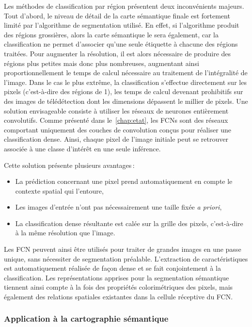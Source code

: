 Les méthodes de classification par région présentent deux inconvénients majeurs. Tout d'abord, le niveau de détail de la carte sémantique finale est fortement limité par l'algorithme de segmentation utilisé. En effet, si l'algorithme produit des régions grossières, alors la carte sémantique le sera également, car la classification ne permet d'associer qu'une seule étiquette à chacune des régions traitées. Pour augmenter la résolution, il est alors nécessaire de produire des régions plus petites mais donc plus nombreuses, augmentant ainsi proportionnellement le temps de calcul nécessaire au traitement de l'intégralité de l'image. Dans le cas le plus extrême, la classification s'effectue directement sur les pixels (c'est-à-dire des régions de \SI{1}{\px}), les temps de calcul devenant prohibitifs sur des images de télédétection dont les dimensions dépassent le millier de pixels.
Une solution envisageable consiste à utiliser les réseaux de neurones entièrement convolutifs. Comme présenté dans le~\cref{chap:etat}, les \glspl{FCN} sont des réseaux comportant uniquement des couches de convolution conçus pour réaliser une classification dense. Ainsi, chaque pixel de l'image initiale peut se retrouver associée à une classe d'intérêt en une seule inférence.

Cette solution présente plusieurs avantages\,:
\begin{itemize}
	\item La prédiction concernant une pixel prend automatiquement en compte le contexte spatial qui l'entoure,
	\item Les images d'entrée n'ont pas nécessairement une taille fixée \emph{a priori},
	\item La classification dense résultante est calée sur la grille des pixels, c'est-à-dire à la même résolution que l'image.
\end{itemize}

Les \gls{FCN} peuvent ainsi être utilisés pour traiter de grandes images en une passe unique, sans nécessiter de segmentation préalable. L'extraction de caractéristiques est automatiquement réalisée de façon dense et se fait conjointement à la classification. Les représentations apprises pour la segmentation sémantique tiennent ainsi compte à la fois des propriétés colorimétriques des pixels, mais également des relations spatiales existantes dans la cellule réceptive du \gls{FCN}.

\subsubsection{Application à la cartographie sémantique}

